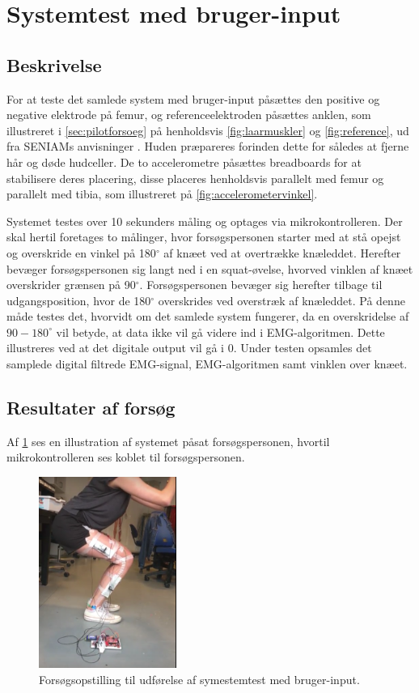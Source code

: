 \section{Systemtest med bruger-input}

\subsection{Beskrivelse}
For at teste det samlede system med bruger-input påsættes den positive og negative elektrode på femur, og referenceelektroden påsættes anklen, som illustreret i \autoref{sec:pilotforsoeg} på henholdsvis \autoref{fig:laarmuskler} og \autoref{fig:reference}, ud fra SENIAMs anvisninger \citep{seniam2016}. Huden præpareres forinden dette for således at fjerne hår og døde hudceller. 
De to accelerometre påsættes breadboards for at stabilisere deres placering, disse placeres henholdsvis parallelt med femur og parallelt med tibia, som illustreret på \autoref{fig:accelerometervinkel}.

Systemet testes over 10 sekunders måling og optages via mikrokontrolleren. Der skal hertil foretages to målinger, hvor forsøgspersonen starter med at stå opejst og overskride en vinkel på 180$^{\circ}$ af knæet ved at overtrække knæleddet. Herefter bevæger forsøgspersonen sig langt ned i en squat-øvelse, hvorved vinklen af knæet overskrider grænsen på 90$^{\circ}$. Forsøgspersonen bevæger sig herefter tilbage til udgangsposition, hvor de 180$^{\circ}$ overskrides ved overstræk af knæleddet.
På denne måde testes det, hvorvidt om det samlede system fungerer, da en overskridelse af $90-180^{\circ}$ vil betyde, at data ikke vil gå videre ind i EMG-algoritmen. Dette illustreres ved at det digitale output vil gå i 0. Under testen opsamles det samplede digital filtrede EMG-signal, EMG-algoritmen samt vinklen over knæet.

\subsection{Resultater af forsøg}

Af \ref{fig:test_squat} ses en illustration af systemet påsat forsøgspersonen, hvortil mikrokontrolleren ses koblet til forsøgspersonen.

\begin{figure}[H]
\centering
\includegraphics[width=0.4\textwidth]{figures/test_squat}
\caption{Forsøgsopstilling til udførelse af symestemtest med bruger-input.}
\label{fig:test_squat}
\end{figure}

